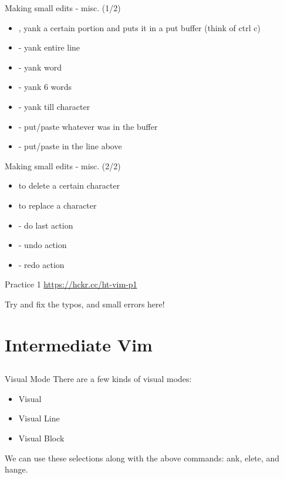 \documentclass[12pt]{beamer}
\begin{document}
\begin{frame}{Making small edits - misc. (1/2)}
    \begin{itemize}
        \item {}, yank a certain portion and puts it in a put buffer (think of ctrl c)
        \item {} - yank entire line
        \item {} - yank word
        \item {} - yank 6 words
        \item {} - yank till character
        \item {} - put/paste whatever was in the buffer
        \item {} - put/paste in the line above
    \end{itemize}{}
\end{frame}{}

\begin{frame}{Making small edits - misc. (2/2)}
    \begin{itemize}
        \item {} to delete a certain character
        \item {} to replace a character
        \item {} - do last action
        \item {} - undo action
        \item {} - redo action
    \end{itemize}{}
\end{frame}{}

\begin{frame}{Practice 1}
    \url{https://hckr.cc/ht-vim-p1}

    Try and fix the typos, and small errors here!
\end{frame}{}

\section{Intermediate Vim}
\subsection{}
\begin{frame}{Visual Mode}
    There are a few kinds of visual modes:
    \begin{itemize}
        \item Visual 
        \item Visual Line 
        \item Visual Block 
    \end{itemize}{}{}
    We can use these selections along with the above commands: ank, elete, and hange.
\end{frame}{}
\end{document}
